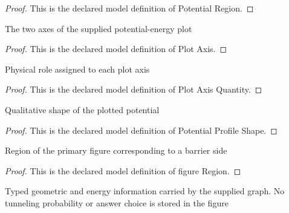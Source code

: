 \begin{proof}
  This is the declared model definition of Potential Region.
\end{proof}
\begin{definition}
  \label{def:physics:phyx-mini-0660:phyxminiproblems-problemphyxmini0660-plotaxis}
  The two axes of the supplied potential-energy plot
\end{definition}
\begin{proof}
  This is the declared model definition of Plot Axis.
\end{proof}
\begin{definition}
  \label{def:physics:phyx-mini-0660:phyxminiproblems-problemphyxmini0660-plotaxisquantity}
  Physical role assigned to each plot axis
\end{definition}
\begin{proof}
  This is the declared model definition of Plot Axis Quantity.
\end{proof}
\begin{definition}
  \label{def:physics:phyx-mini-0660:phyxminiproblems-problemphyxmini0660-potentialprofileshape}
  Qualitative shape of the plotted potential
\end{definition}
\begin{proof}
  This is the declared model definition of Potential Profile Shape.
\end{proof}
\begin{definition}
  \label{def:physics:phyx-mini-0660:phyxminiproblems-problemphyxmini0660-barrierside-figureregion}
  Region of the primary figure corresponding to a barrier side
\end{definition}
\begin{proof}
  This is the declared model definition of figure Region.
\end{proof}
\begin{definition}
  \label{def:physics:phyx-mini-0660:phyxminiproblems-problemphyxmini0660-nuclearpotentialfigure}
  Typed geometric and energy information carried by the supplied graph. No tunneling probability or answer choice is stored in the figure
\end{definition}
